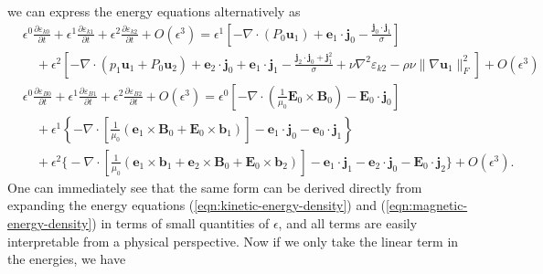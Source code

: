 %
we can express the energy equations alternatively as 
%
\begin{equation}\label{eqn:energy-epsilon-expand-alt}
    \begin{aligned}    
        &\epsilon^0 \frac{\partial \varepsilon_{k0}}{\partial t} + \epsilon^1 \frac{\partial \varepsilon_{k1}}{\partial t} + \epsilon^2 \frac{\partial \varepsilon_{k2}}{\partial t} + O\left(\epsilon^3\right)
        = \epsilon^1 \left[- \nabla\cdot(P_0\mathbf{u}_1) + \mathbf{e}_1 \cdot \mathbf{j}_0 - \frac{\mathbf{j}_0\cdot \mathbf{j}_1}{\sigma}\right] \\
        &\quad + \epsilon^2 \left[- \nabla \cdot (p_1\mathbf{u}_1 + P_0\mathbf{u}_2) + \mathbf{e}_2 \cdot \mathbf{j}_0 + \mathbf{e}_1\cdot \mathbf{j}_1 - \frac{\mathbf{j}_2\cdot \mathbf{j}_0 + \mathbf{j}_1^2}{\sigma} + \nu \nabla^2 \varepsilon_{k2} - \rho \nu \|\nabla \mathbf{u}_1\|_F^2\right] + O\left(\epsilon^3\right) \\ 
        &\epsilon^0 \frac{\partial \varepsilon_{B0}}{\partial t} + \epsilon^1 \frac{\partial \varepsilon_{B1}}{\partial t} + \epsilon^2 \frac{\partial \varepsilon_{B2}}{\partial t} + O\left(\epsilon^3\right) = \epsilon^0 \left[- \nabla\cdot \left(\frac{1}{\mu_0} \mathbf{E}_0 \times \mathbf{B}_0\right) - \mathbf{E}_0\cdot \mathbf{j}_0\right] \\
        &\quad + \epsilon^1 \left\{- \nabla\cdot \left[\frac{1}{\mu_0} \left(\mathbf{e}_1\times \mathbf{B}_0 + \mathbf{E}_0\times \mathbf{b}_1\right)\right] - \mathbf{e}_1\cdot \mathbf{j}_0 - \mathbf{e}_0\cdot \mathbf{j}_1 \right\} \\
        &\quad + \epsilon^2 \bigg\{-\nabla\cdot \left[\frac{1}{\mu_0} (\mathbf{e}_1 \times \mathbf{b}_1 + \mathbf{e}_2\times \mathbf{B}_0 + \mathbf{E}_0\times \mathbf{b}_2)\right] - \mathbf{e}_1\cdot \mathbf{j}_1 - \mathbf{e}_2\cdot \mathbf{j}_0 - \mathbf{E}_0\cdot \mathbf{j}_2 \bigg\} + O\left(\epsilon^3\right).
    \end{aligned}
\end{equation}
%
One can immediately see that the same form can be derived directly from expanding the energy equations (\ref{eqn:kinetic-energy-density}) and (\ref{eqn:magnetic-energy-density}) in terms of small quantities of $\epsilon$, and all terms are easily interpretable from a physical perspective. Now if we only take the linear term in the energies, we have
%
